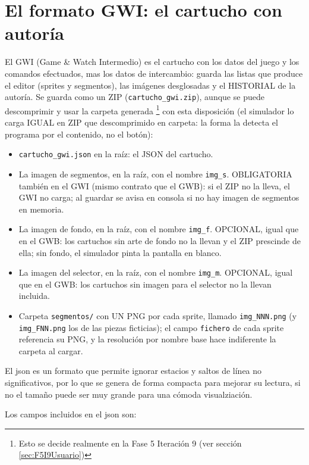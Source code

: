 \section{El formato GWI: el cartucho con autoría}
\label{sec:A02GWI}


El GWI (Game \& Watch Intermedio) es el cartucho con los datos del juego y los comandos efectuados, mas los datos de intercambio: guarda las listas que produce el editor (sprites y segmentos),
las imágenes desglosadas y el HISTORIAL de la autoría. Se guarda como un ZIP
(\texttt{cartucho\_gwi.zip}), aunque se puede descomprimir y usar la carpeta generada \footnote{Esto se decide realmente en la Fase 5 Iteración 9 (ver sección \ref{sec:F5I9Usuario})} con esta disposición (el simulador lo carga
IGUAL en ZIP que descomprimido en carpeta: la forma la detecta el
programa por el contenido, no el botón):

\begin{itemize}
	\item \texttt{cartucho\_gwi.json} en la raíz: el JSON del cartucho.
	\item La imagen de segmentos, en la raíz, con el nombre 
	\texttt{img\_s}. OBLIGATORIA también en el GWI (mismo contrato que el GWB): si el ZIP no la lleva, el GWI no carga; al guardar se avisa en consola si no hay imagen de segmentos en memoria.
	\item La imagen de fondo, en la raíz, con el nombre \texttt{img\_f}. OPCIONAL, igual que en el GWB: los cartuchos sin arte de fondo no la llevan y el ZIP prescinde de ella; sin fondo, el simulador pinta la pantalla en blanco.
	\item La imagen del selector, en la raíz, con el nombre \texttt{img\_m}. OPCIONAL, igual que en el GWB: los cartuchos sin imagen para el selector no la llevan incluida.
	\item Carpeta \texttt{segmentos/} con UN PNG por cada sprite, llamado
	\texttt{img\_NNN.png} (y \texttt{img\_FNN.png} los de las piezas
	ficticias); el campo \texttt{fichero} de cada sprite referencia su
	PNG, y la resolución por nombre base hace indiferente la carpeta al
	cargar.
\end{itemize}

El json es un formato que permite ignorar estacios y saltos de línea no significativos, por lo que se genera de forma compacta para mejorar su lectura, si no el tamaño puede ser muy grande para una cómoda visualziación.

Los campos incluidos en el json son:

